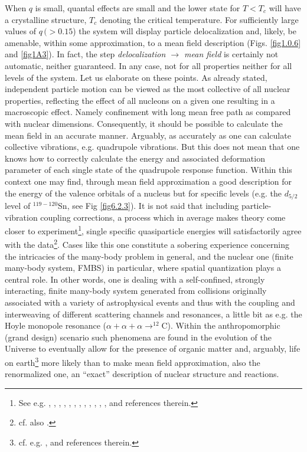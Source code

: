  
  When $q$ is small, quantal effects are small and the lower state for $T<T_c$ will have a crystalline structure, $T_c$ denoting the critical temperature.  For sufficiently large values of $q\, (>0.15$) the system will display particle delocalization and,  likely, be  amenable, within some approximation, to a mean field description (Figs. \ref{fig1.0.6} and   \ref{fig1A3}). In fact, the step \textit{delocalization $\rightarrow$ mean field} is certainly not automatic, neither guaranteed. In any case, not for all properties neither for all levels of the system. Let us elaborate on these points. As already stated, independent particle motion can be viewed as the most collective of all nuclear properties, reflecting the effect of all nucleons on a given one resulting in a macroscopic effect. Namely confinement with long mean free path as compared with nuclear dimensions. Consequently, it should be possible to calculate the mean field in an accurate manner. Arguably, as accurately as one can calculate collective vibrations, e.g. quadrupole vibrations. But this does not mean that one knows how to correctly calculate the energy and associated deformation parameter of each single state of the quadrupole response function. Within this context one may find, through mean field approximation a good description for the energy of the valence orbitals of a nucleus but for  specific levels (e.g. the $d_{5/2}$ level of $^{119-120}$Sn, see Fig \ref{fig6.2.3}). It is not said that  including  particle-vibration coupling corrections, a process which in average makes theory come closer to experiment\footnote{See e.g. \cite{Bohr:75}, \cite{Bohr:77}, \cite{Hamamoto:77}, \cite{Bes:77c}, \cite{Reich:74}, \cite{Hamamoto:76}, \cite{Bortignon:77}, \cite{Mahaux:85}, \cite{Bes:71,Flynn:71}, \cite{Bortignon:76}, \cite{Bes:88}, \cite{Barranco:87b}, \cite{Barranco:01,Orrigo:09} and references therein.}, single specific quasiparticle energies will satisfactorily agree  with the data\footnote{cf. also \cite{Tarpanov:14}.}. Cases like this one constitute a sobering experience concerning the intricacies of the many-body problem in general, and the nuclear one (finite many-body system, FMBS) in particular, where spatial quantization plays a central role. In other words, one is dealing with a self-confined, strongly interacting, finite many-body system generated from collisions originally associated  with a variety of astrophysical events and thus with  the coupling and interweaving of different scattering channels and resonances, a little bit as e.g. the Hoyle monopole resonance ($\alpha+\alpha+\alpha\rightarrow^{12}$C). Within the anthropomorphic (grand design) scenario such phenomena are found in the evolution of the Universe to eventually allow for the presence of organic matter and, arguably, life on earth\footnote{cf. e.g. \cite{Rees:00}, \cite{Meissner:15} and references therein.} more likely than to make mean field approximation, also the renormalized one, an ``exact'' description of nuclear structure and reactions.
 
